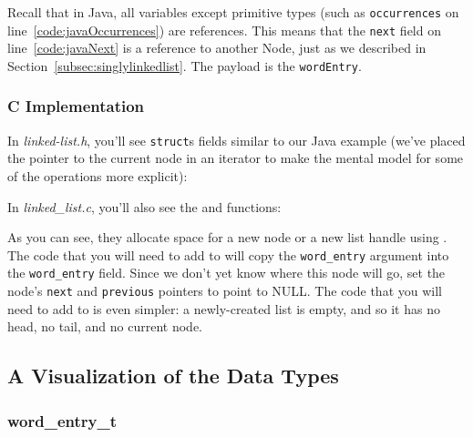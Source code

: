 Recall that in Java, all variables except primitive types (such as \lstinline{occurrences} on line~\ref{code:javaOccurrences}) are references.
This means that the \lstinline{next} field on line~\ref{code:javaNext} is a reference to another Node, just as we described in Section~\ref{subsec:singlylinkedlist}.
The payload is the \lstinline{wordEntry}.

\subsubsection{C Implementation} \label{subsubsec:cImplementation}

In \textit{linked-list.h}, you'll see \lstinline{struct}s fields similar to our Java example
(we've placed the pointer to the current node in an iterator to make the mental model for some of the operations more explicit):







In \textit{linked\_list.c}, you'll also see the  and  functions:





As you can see, they allocate space for a new node or a new list handle using .
The code that you will need to add to  will copy the \lstinline{word_entry} argument into the \lstinline{word_entry} field.
Since we don't yet know where this node will go, set the node's \lstinline{next} and \lstinline{previous} pointers to point to NULL\@.
The code that you will need to add to  is even simpler: a newly-created list is empty, and so it has no head, no tail, and no current node.


\subsection{A Visualization of the Data Types}

\subsubsection{word\_entry\_t}

